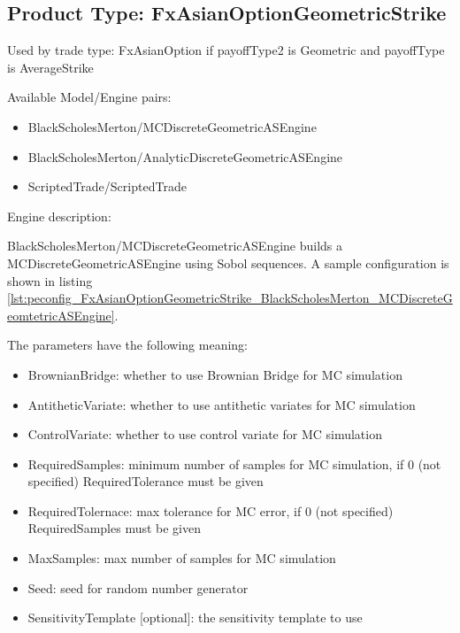 \subsection{Product Type: FxAsianOptionGeometricStrike}

Used by trade type: FxAsianOption if payoffType2 is Geometric and payoffType is AverageStrike

Available Model/Engine pairs:

\begin{itemize}
  \item BlackScholesMerton/MCDiscreteGeometricASEngine
  \item BlackScholesMerton/AnalyticDiscreteGeometricASEngine
  \item ScriptedTrade/ScriptedTrade
\end{itemize}

Engine description:

BlackScholesMerton/MCDiscreteGeometricASEngine builds a MCDiscreteGeometricASEngine using Sobol sequences. A sample
configuration is shown in listing
\ref{lst:peconfig_FxAsianOptionGeometricStrike_BlackScholesMerton_MCDiscreteGeomtetricASEngine}.

The parameters have the following meaning:

\begin{itemize}
\item BrownianBridge: whether to use Brownian Bridge for MC simulation
\item AntitheticVariate: whether to use antithetic variates for MC simulation
\item ControlVariate: whether to use control variate for MC simulation
\item RequiredSamples: minimum number of samples for MC simulation, if 0 (not specified) RequiredTolerance must be given
\item RequiredTolernace: max tolerance for MC error, if 0 (not specified) RequiredSamples must be given
\item MaxSamples: max number of samples for MC simulation
\item Seed: seed for random number generator
\item SensitivityTemplate [optional]: the sensitivity template to use 
\end{itemize}

